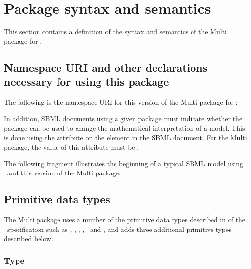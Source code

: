 
\section{Package syntax and semantics}
\label{def:Package_syntax_semantics}

This section contains a definition of the syntax and semantics of the Multi package for \SbmlLevelThreeCore.

\subsection{Namespace URI and other declarations necessary for using this package}
\label{def:Namespace_URI}

The following is the namespace URI for this version of the Multi package for \SbmlLevelThreeCore:
\begin{center}
\end{center}

In addition, SBML documents using a given package must indicate whether the package can be used to change the mathematical interpretation of a model. This is done using the attribute  on the  element in the SBML document. For the Multi package, the value of this attribute must be .

The following fragment illustrates the beginning of a typical SBML model using \SbmlLevelThreeCore\ and this version of the Multi package:

\subsection{Primitive data types}
\label{def:Primitive_data_types}

The Multi package uses a number of the primitive data types described in  of the \SbmlLevelThreeCoreWC\ specification such as \SIdPT, \SIdRefPT, \stringPT, \booleanPT, \intPT\ and \positiveIntegerPT, and adds three additional primitive types described below.

\subsubsection{Type \BindingStatusPT}
\label{def:Primtype:BindingStatus}

